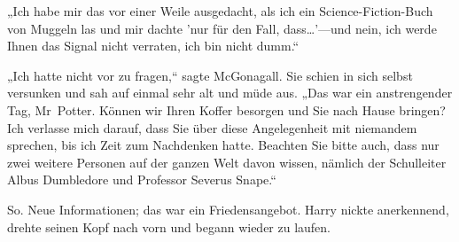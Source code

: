 „Ich habe mir das vor einer Weile ausgedacht, als ich ein Science-Fiction-Buch von Muggeln las und mir dachte 'nur für den Fall, dass…'—und nein, ich werde Ihnen das Signal nicht verraten, ich bin nicht dumm.“

„Ich hatte nicht vor zu fragen,“ sagte McGonagall. Sie schien in sich selbst versunken und sah auf einmal sehr alt und müde aus. „Das war ein anstrengender Tag, Mr~Potter. Können wir Ihren Koffer besorgen und Sie nach Hause bringen? Ich verlasse mich darauf, dass Sie über diese Angelegenheit mit niemandem sprechen, bis ich Zeit zum Nachdenken hatte. Beachten Sie bitte auch, dass nur zwei weitere Personen auf der ganzen Welt davon wissen, nämlich der Schulleiter Albus Dumbledore und Professor Severus Snape.“

So. Neue Informationen; das war ein Friedensangebot. Harry nickte anerkennend, drehte seinen Kopf nach vorn und begann wieder zu laufen.

